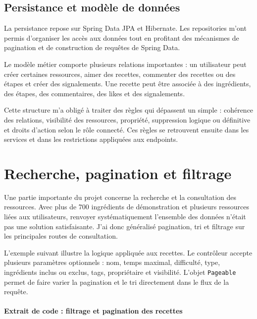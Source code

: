 \subsection{Persistance et modèle de données}

La persistance repose sur Spring Data JPA et Hibernate. Les repositories m'ont permis d'organiser les accès aux données tout en profitant des mécanismes de pagination et de construction de requêtes de Spring Data.

Le modèle métier comporte plusieurs relations importantes : un utilisateur peut créer certaines ressources, aimer des recettes, commenter des recettes ou des étapes et créer des signalements. Une recette peut être associée à des ingrédients, des étapes, des commentaires, des likes et des signalements.

Cette structure m'a obligé à traiter des règles qui dépassent un  simple : cohérence des relations, visibilité des ressources, propriété, suppression logique ou définitive et droits d'action selon le rôle connecté. Ces règles se retrouvent ensuite dans les services et dans les restrictions appliquées aux endpoints.

\section{Recherche, pagination et filtrage}

Une partie importante du projet concerne la recherche et la consultation des ressources. Avec plus de 700 ingrédients de démonstration et plusieurs ressources liées aux utilisateurs, renvoyer systématiquement l'ensemble des données n'était pas une solution satisfaisante. J'ai donc généralisé pagination, tri et filtrage sur les principales routes de consultation.

L'exemple suivant illustre la logique appliquée aux recettes. Le contrôleur accepte plusieurs paramètres optionnels : nom, temps maximal, difficulté, type, ingrédients inclus ou exclus, tags, propriétaire et visibilité. L'objet \texttt{Pageable} permet de faire varier la pagination et le tri directement dans le flux de la requête.

\paragraph{Extrait de code : filtrage et pagination des recettes}

